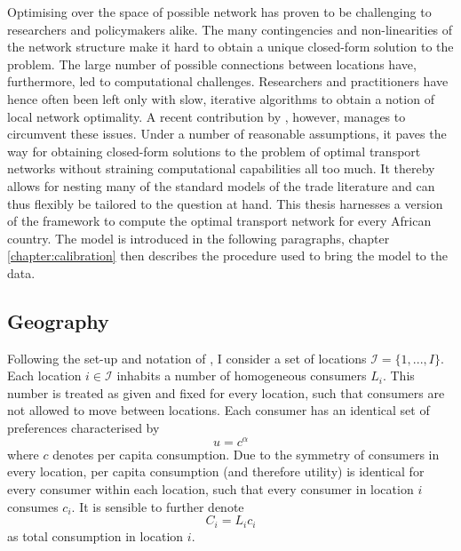 \documentclass[11pt, oneside]{article}   	%
\begin{document}
Optimising over the space of possible network has proven to be challenging to researchers and policymakers alike. The many contingencies and non-linearities of the network structure make it hard to obtain a unique closed-form solution to the problem. The large number of possible connections between locations have, furthermore, led to computational challenges. Researchers and practitioners have hence often been left only with slow, iterative algorithms to obtain a notion of local network optimality. A recent contribution by \cite{fajgelbaum_optimal_2017}, however, manages to circumvent these issues. Under a number of reasonable assumptions, it paves the way for obtaining closed-form solutions to the problem of optimal transport networks without straining computational capabilities all too much. It thereby allows for nesting many of the standard models of the trade literature and can thus flexibly be tailored to the question at hand. This thesis harnesses a version of the \citeauthor{fajgelbaum_optimal_2017} framework to compute the optimal transport network for every African country. The model is introduced in the following paragraphs, chapter \eqref{chapter:calibration} then describes the procedure used to bring the model to the data.

\subsection{Geography}

Following the set-up and notation of \cite{fajgelbaum_optimal_2017}, I consider a set of locations $\mathcal{I} =\{ 1,...,I\}$. Each location $i \in \mathcal{I}$ inhabits a number of homogeneous consumers $L_{i}$. This number is treated as given and fixed for every location, such that consumers are not allowed to move between locations. Each consumer has an identical set of preferences characterised by
\begin{equation*}
  u = c^{\alpha}
\end{equation*}
where $c$ denotes per capita consumption. Due to the symmetry of consumers in every location, per capita consumption (and therefore utility) is identical for every consumer within each location, such that every consumer in location $i$ consumes $c_{i}$. It is sensible to further denote
\begin{equation*}
  C_{i} = L_{i}c_{i}
\end{equation*}
as total consumption in location $i$.
\end{document}
